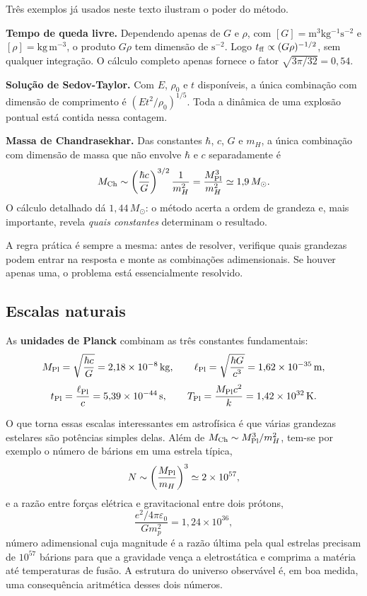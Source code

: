 \documentclass[11pt,a4paper]{article}
\begin{document}
Três exemplos já usados neste texto ilustram o poder do método.

\textbf{Tempo de queda livre.} Dependendo apenas de $G$ e $\rho$, com $[G]=\mathrm{m^{3}kg^{-1}s^{-2}}$ e $[\rho]=\mathrm{kg\,m^{-3}}$, o produto $G\rho$ tem dimensão de $\mathrm{s^{-2}}$. Logo $t_{\rm ff}\propto(G\rho)^{-1/2}$, sem qualquer integração. O cálculo completo apenas fornece o fator $\sqrt{3\pi/32}=0{,}54$.

\textbf{Solução de Sedov-Taylor.} Com $E$, $\rho_0$ e $t$ disponíveis, a única combinação com dimensão de comprimento é $(Et^{2}/\rho_0)^{1/5}$. Toda a dinâmica de uma explosão pontual está contida nessa contagem.

\textbf{Massa de Chandrasekhar.} Das constantes $\hbar$, $c$, $G$ e $m_H$, a única combinação com dimensão de massa que não envolve $\hbar$ e $c$ separadamente é
\[
M_{\rm Ch}\sim\left(\frac{\hbar c}{G}\right)^{3/2}\frac{1}{m_H^{2}}=\frac{M_{\rm Pl}^{3}}{m_H^{2}}\simeq1{,}9\,M_\odot.
\]
O cálculo detalhado dá $1{,}44\,M_\odot$: o método acerta a ordem de grandeza e, mais importante, revela \emph{quais constantes} determinam o resultado.

A regra prática é sempre a mesma: antes de resolver, verifique quais grandezas podem entrar na resposta e monte as combinações adimensionais. Se houver apenas uma, o problema está essencialmente resolvido.

\subsection*{Escalas naturais}

As \textbf{unidades de Planck} combinam as três constantes fundamentais:
\[
M_{\rm Pl}=\sqrt{\frac{\hbar c}{G}}=2{,}18\times10^{-8}\,\mathrm{kg},
\qquad
\ell_{\rm Pl}=\sqrt{\frac{\hbar G}{c^{3}}}=1{,}62\times10^{-35}\,\mathrm{m},
\]
\[
t_{\rm Pl}=\frac{\ell_{\rm Pl}}{c}=5{,}39\times10^{-44}\,\mathrm{s},
\qquad
T_{\rm Pl}=\frac{M_{\rm Pl}c^{2}}{k}=1{,}42\times10^{32}\,\mathrm{K}.
\]

O que torna essas escalas interessantes em astrofísica é que várias grandezas estelares são potências simples delas. Além de $M_{\rm Ch}\sim M_{\rm Pl}^{3}/m_H^{2}$, tem-se por exemplo o número de bárions em uma estrela típica,
\[
N\sim\left(\frac{M_{\rm Pl}}{m_H}\right)^{3}\simeq2\times10^{57},
\]
e a razão entre forças elétrica e gravitacional entre dois prótons,
\[
\frac{e^{2}/4\pi\varepsilon_0}{Gm_p^{2}}=1{,}24\times10^{36},
\]
número adimensional cuja magnitude é a razão última pela qual estrelas precisam de $10^{57}$ bárions para que a gravidade vença a eletrostática e comprima a matéria até temperaturas de fusão. A estrutura do universo observável é, em boa medida, uma consequência aritmética desses dois números.
\end{document}
